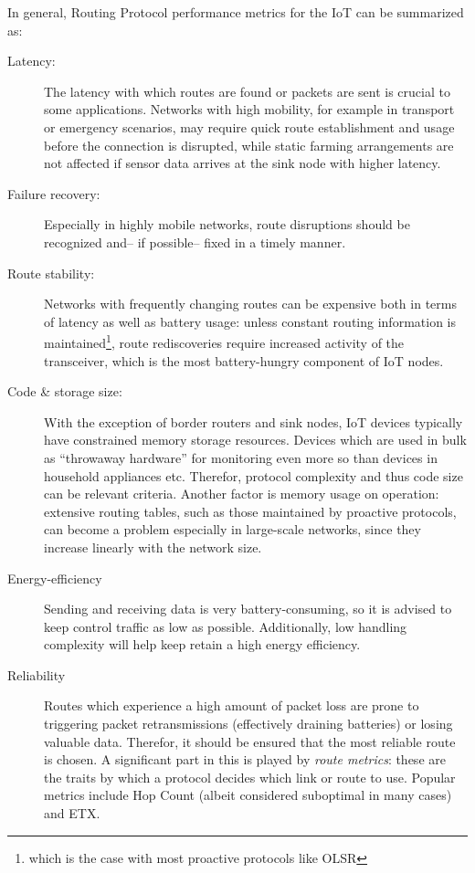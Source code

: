 \documentclass{acm_proc_article-sp}
\begin{document}
In general, Routing Protocol performance metrics for the IoT can be summarized as:
\begin{description}
\item[Latency:] The latency with which routes are found or packets are sent is crucial to some applications. Networks with high mobility, for example in transport or emergency scenarios, may require quick route establishment and usage before the connection is disrupted, while static farming arrangements are not affected if sensor data arrives at the sink node with higher latency.
\item[Failure recovery:] Especially in highly mobile networks, route disruptions should be recognized and-- if possible-- fixed in a timely manner.
\item[Route stability:] Networks with frequently changing routes can be expensive both in terms of latency as well as battery usage: unless constant routing information is maintained\footnote{ which is the case with most proactive protocols like OLSR\cite{RFC-3626}}, route rediscoveries require increased activity of the transceiver, which is the most battery-hungry component of IoT nodes.
\item[Code \& storage size:] With the exception of border routers and sink nodes, IoT devices typically have constrained memory storage resources. Devices which are used in bulk as ``throwaway hardware'' for monitoring even more so than devices in household appliances etc. Therefor, protocol complexity and thus code size can be relevant criteria. Another factor is memory usage on operation: extensive routing tables, such as those maintained by proactive protocols, can become a problem especially in large-scale networks, since they increase linearly with the network size.
\item[Energy-efficiency] Sending and receiving data is very battery-consuming, so it is advised to keep control traffic as low as possible. Additionally, low handling complexity will help keep retain a high energy efficiency.
\item[Reliability] Routes which experience a high amount of packet loss are prone to triggering packet retransmissions (effectively draining batteries) or losing valuable data. Therefor,
 it should be ensured that the most reliable route is chosen. A significant part in this is played by \emph{route metrics}: these are the traits by which a protocol decides which link or route to use. Popular metrics include Hop Count (albeit considered suboptimal in many cases) and \gls{ETX}.\end{description}
\end{document}
